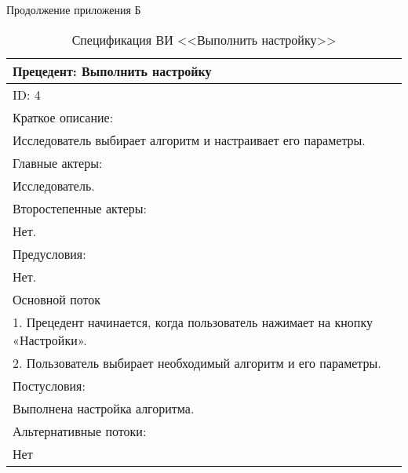 \newpage
\begin{flushright}
Продолжение приложения Б 
\end{flushright}
\vspace{-1.5em}
\begin{table}[H]
    \caption{Спецификация ВИ <<Выполнить настройку>>}
    \vspace{1em}
    \begin{tabular}{|p{\textwidth}|}
       \hline
        Прецедент: Выполнить настройку\\ \hline
        ID: 4\\ \hline
        Краткое описание: \\ Исследователь выбирает алгоритм и настраивает его параметры. \\ \hline
        Главные актеры: \\ Исследователь.\\ \hline
        Второстепенные актеры:\\ Нет. \\ \hline
        Предусловия: \\ Нет. \\ \hline
        Основной поток\\ 
        1. Прецедент начинается, когда пользователь нажимает на кнопку «Настройки». \\ 
        2. Пользователь выбирает необходимый алгоритм и его параметры. \\  \hline
        Постусловия: \\ Выполнена настройка алгоритма. \\ \hline
        Альтернативные потоки: \\ Нет \\ \hline
        \end{tabular} 
    \label{tab:Settings}
\end{table}
\vspace{2em}


